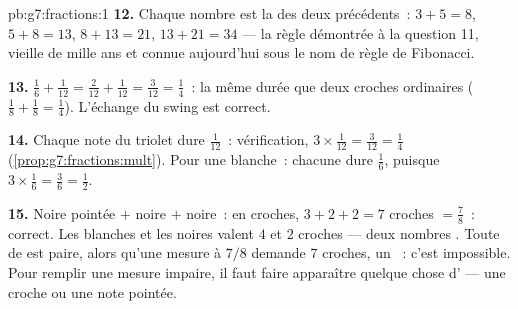 \begin{solution}{pb:g7:fractions:1}
\textbf{12.} Chaque nombre est la  des deux précédents~:
$3 + 5 = 8$, $5 + 8 = 13$, $8 + 13 = 21$, $13 + 21 = 34$ --- la
règle démontrée à la question 11, vieille de mille ans et connue
aujourd'hui sous le nom de règle de Fibonacci.

\textbf{13.} $\frac16 + \frac{1}{12} = \frac{2}{12} +
\frac{1}{12} = \frac{3}{12} = \frac14$~: la même durée que deux
croches ordinaires ($\frac18 + \frac18 = \frac14$). L'échange du
swing est correct.

\textbf{14.} Chaque note du triolet dure $\frac{1}{12}$~:
vérification, $3 \times \frac{1}{12} = \frac{3}{12} = \frac14$
(\cref{prop:g7:fractions:mult}). Pour une blanche~: chacune dure
$\frac16$, puisque $3 \times \frac16 = \frac36 = \frac12$.

\textbf{15.} Noire pointée $+$ noire $+$ noire~: en croches,
$3 + 2 + 2 = 7$ croches $= \frac78$~: correct. Les blanches et les
noires valent $4$ et $2$ croches --- deux nombres \emph{}.
Toute  de  est paire, alors qu'une mesure à $7/8$
demande $7$ croches, un ~: c'est impossible. Pour
remplir une mesure impaire, il faut faire apparaître quelque chose
d' --- une croche ou une note pointée.
\end{solution}
